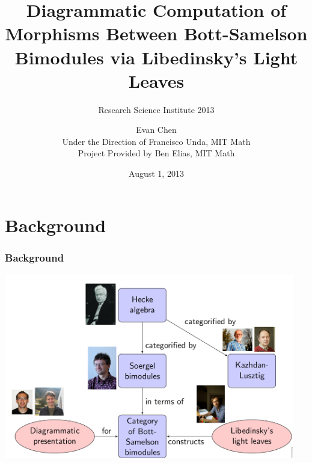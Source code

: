 \documentclass[pdf]{beamer}
\begin{document}
\title[Bott-Samelson Bimodules]{Diagrammatic Computation of Morphisms Between Bott-Samelson Bimodules via Libedinsky's Light Leaves}
\subtitle[RSI 2013]{Research Science Institute 2013}
\author[Evan Chen]{Evan Chen \\ Under the Direction of Francisco Unda, MIT Math \\ Project Provided by Ben Elias, MIT Math\vspace{-2em}}
\date{August 1, 2013}

\begin{frame}
	\maketitle
\end{frame}

\section{Background}
\begin{frame}[fragile]
	\frametitle{Background}
	\includegraphics[width=0.95\textwidth]{hecke.png}
\end{frame}
\end{document}

